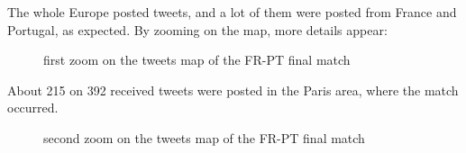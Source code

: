 \documentclass[a4paper,11pt]{report}
\begin{document}
The whole Europe posted tweets, and a lot of them were posted from France and Portugal, as expected. By zooming on the map, more details appear:
\begin{figure}[H]
\vspace{-5pt}
\begin{center}
\vspace{-20pt}
\caption{first zoom on the tweets map of the FR-PT final match}
\end{center}
\end{figure}
\vspace{-10pt}

About 215 on 392 received tweets were posted in the Paris area, where the match occurred.
\begin{figure}[H]
\vspace{-5pt}
\begin{center}
\vspace{-20pt}
\caption{second zoom on the tweets map of the FR-PT final match}
\end{center}
\end{figure}
\vspace{-10pt}
\end{document}
